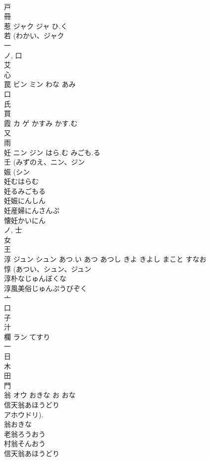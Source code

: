 \documentclass[8pt]{extreport}
\begin{document}
\begin{CJK}{UTF8}{min}
\\	戸 
\\	冊 
\\	惹	ジャク ジャ	ひ.く	
\\	若 (わかい、ジャク 
\\	一 
\\	ノ, 口 
\\	艾 
\\	心 
\\	罠	ビン ミン	わな あみ	
\\	口 
\\	氏 
\\	買 
\\	霞	カ ゲ	かすみ かす.む	
\\	又 
\\	雨 
\\	妊	ニン ジン	はら.む みごも.る	
\\	壬 (みずのえ、ニン、ジン 
\\	娠 (シン 
\\	妊むはらむ
\\	妊るみごもる
\\	妊娠にんしん
\\	妊産婦にんさんぷ
\\	懐妊かいにん
\\	ノ, 士 
\\	女 
\\	王 
\\	淳	ジュン シュン	あつ.い あつ あつし きよ きよし まこと すなお	
\\	惇 (あつい、シュン、ジュン 
\\	淳朴なじゅんぼくな
\\	淳風美俗じゅんぷうびぞく
\\	亠 
\\	口 
\\	子 
\\	汁 
\\	欄	ラン	てすり	
\\	一 
\\	日 
\\	木 
\\	田 
\\	門 
\\	翁	オウ	おきな お おな	
\\	信天翁あほうどり 
\\	アホウドリ).
\\	翁おきな 
\\	老翁ろうおう 
\\	村翁そんおう 
\\	信天翁あほうどり 

\end{CJK}
\end{document}
